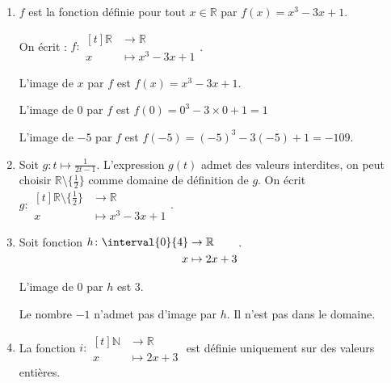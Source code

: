 \documentclass[main.tex]{subfiles}
\begin{document}
\begin{example}\hfill 
	\begin{enumerate}[label=\alph*)]
		\item {} 
	$f$ est la fonction définie pour tout  $x\in\mathbb{R}$ par $f(x)=x^3-3x+1$. 
		
		On écrit : $f\colon \begin{aligned}[t] \mathbb{R} &\to \mathbb{R}\\
			x&\mapsto x^3-3x+1
		\end{aligned}$.
	
	L'image de $x$ par $f$ est $f(x)=x^3-3x+1$.
	
	L'image de $0$ par $f$ est $f(0)=0^3-3\times 0 + 1=1$
	
	L'image de $-5$ par $f$ est $f(-5)= (-5)^3-3(-5)+1=-109$.
		\item Soit $g\colon t\mapsto\frac{1}{2t-1}$. L'expression $g(t)$ admet des valeurs interdites, on peut choisir  $\mathbb{R}\setminus \{\tfrac{1}{2}\}$ comme domaine de définition de $g$. On écrit $g\colon   \begin{aligned}[t]\mathbb{R}\setminus \{\tfrac{1}{2}\} &\to \mathbb{R}\\
			x&\mapsto x^3-3x+1
		\end{aligned}$.
		\item  {}  Soit fonction $h\colon \begin{aligned}[t] \interval{0}{4} &\to \mathbb{R}\\
			x&\mapsto 2x+3
		\end{aligned}$.  
	
		L'image de $0$ par $h$ est $3$. 
		
		Le nombre $-1$ n'admet pas d'image par $h$. Il n'est pas dans le domaine. 
		\item  {} 
	La fonction $i\colon \begin{aligned}[t] \mathbb{N} &\to \mathbb{R}\\
			x&\mapsto 2x+3
		\end{aligned}$ est définie uniquement sur des valeurs entières.
	\end{enumerate}
\end{example}
\end{document}
